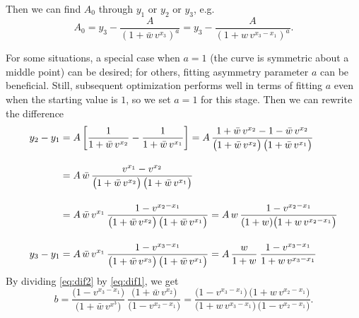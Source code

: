 \documentclass[12pt]{article}
\theoremstyle{remark}
\begin{document}
Then we can find $A_0$ through $y_1$ or $y_2$ or $y_3$, e.g.
\begin{equation} \label{eq:A0}
  A_0 = y_3 - \frac{A}{\left(1 + \bar{w} \, v^{x_3} \right)^a}
        = y_3 - \frac{A}{\left(1 + w \, v^{x_3 - x_1} \right)^a}.
\end{equation}

For some situations, a special case when $a = 1$ (the curve is
symmetric about a middle point) can be desired; for others, fitting
asymmetry parameter $a$ can be beneficial. Still, subsequent
optimization performs well in terms of fitting $a$ even when the
starting value is $1$, so we set $a = 1$ for this stage. Then we can
rewrite the difference 
\begin{align}
  y_2 - y_1 &= A \left[ \frac{1}{1 + \bar{w} \, v^{x_2}}
                             - \frac{1}{1 + \bar{w} \, v^{x_1}} \right]
              = A \, \frac{1 + \bar{w} \, v^{x_2}
              - 1 - \bar{w} \, v^{x_2}}
              {\big(1 + \bar{w} \, v^{x_2} \big) \,
              \big(1 + \bar{w} \, v^{x_1} \big)} \notag \\[1em]
            & = A \, \bar{w} \, \frac{v^{x_1} - v^{x_2}}
              {\big(1 + \bar{w} \, v^{x_2} \big) \,
              \big(1 + \bar{w} \, v^{x_1} \big)} \notag \\[1em]
            & = A \, \bar{w} \, v^{x_1} \, \label{eq:dif1}
              \frac{1 - v^{x_2 - x_1}}
             {\big(1 + \bar{w} \, v^{x_2} \big) \,
              \big(1 + \bar{w} \, v^{x_1} \big)} 
             = A \, w \, \frac{1 - v^{x_2 - x_1}}
              {(1 + w) \big(1 + w \, v^{x_2 - x_1}\big)} \\[1em]
  y_3 - y_1 &= A \, \bar{w} \, v^{x_1} \, \label{eq:dif2}
              \frac{1 - v^{x_3 - x_1}}
             {\big(1 + \bar{w} \, v^{x_3} \big) \,
              \big(1 + \bar{w} \, v^{x_1} \big)} 
             = A \, \frac{w}{1 + w} \: \frac{1 - v^{x_3 - x_1}}
              {1 + w \, v^{x_3 - x_1}}
\end{align}
By dividing \eqref{eq:dif2} by \eqref{eq:dif1}, we get
\begin{equation}
  b = \frac{\big(1 - v^{x_3 - x_1} \big)}
    {\big( 1 + \bar{w} \, v^{x^3} \big)} \:
    \frac{\big(1 + \bar{w} \, v^{x_2} \big)}
           {\big(1 - v^{x_2 - x_1}\big)}
      = \frac{\big(1 - v^{x_3 - x_1}\big) \,
                 \big(1 + w \, v^{x_2 - x_1}\big)}
               {\big(1 + w \, v^{x_3 - x_1}\big) \,
                \big(1 - v^{x_2 - x_1}\big)}.   
\end{equation}
\end{document}
